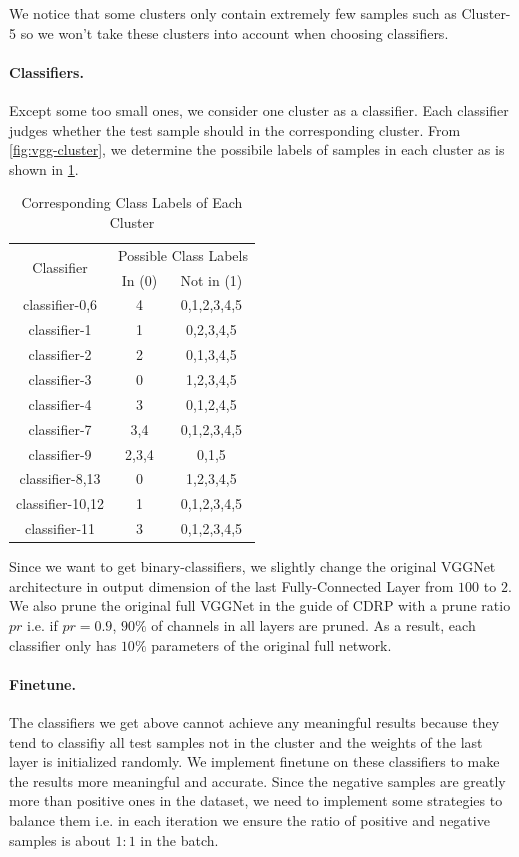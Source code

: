 \documentclass[sigplan,10pt,review]{acmart}\settopmatter{printfolios=true,printccs=false,printacmref=false}
\begin{document}
We notice that some clusters only contain extremely few samples such as Cluster-5 so we won't take these clusters into account when choosing classifiers.

\paragraph{Classifiers.} Except some too small ones, we consider one cluster as a classifier. Each classifier judges whether the test sample should in the corresponding cluster. 
From \cref{fig:vgg-cluster}, we determine the possibile labels of samples in each cluster as is shown in \cref{tab:cluster_label}. 

\begin{table}[h]
	\caption{Corresponding Class Labels of Each Cluster}
	\label{tab:cluster_label}
	\begin{tabular}{|c|c|c|}
	\hline
	\multirow{2}{*}{Classifier} &\multicolumn{2}{c|}{Possible Class Labels}\\
	\cline{2-3}
	& In (0) & Not in (1)\\
	\hline
	classifier-0,6 & 4 & 0,1,2,3,4,5\\
	classifier-1 & 1 & 0,2,3,4,5\\
	classifier-2 & 2 & 0,1,3,4,5\\
	classifier-3 & 0 & 1,2,3,4,5\\
	classifier-4 & 3 & 0,1,2,4,5\\
	classifier-7 & 3,4 & 0,1,2,3,4,5\\ 
	classifier-9 & 2,3,4 & 0,1,5\\ 
	classifier-8,13 & 0 & 1,2,3,4,5\\
	classifier-10,12 & 1 & 0,1,2,3,4,5\\
	classifier-11 & 3 & 0,1,2,3,4,5\\
	\hline
	\end{tabular}
\end{table}

Since we want to get binary-classifiers, we slightly change the original VGGNet architecture in output dimension of the last Fully-Connected Layer from $100$ to $2$. 
We also prune the original full VGGNet in the guide of CDRP with a prune ratio $pr$ i.e. if $pr=0.9$, $90\%$ of channels in all layers are pruned. 
As a result, each classifier only has $10\%$ parameters of the original full network.

\paragraph{Finetune.} The classifiers we get above cannot achieve any meaningful results because they tend to classifiy all test samples not in the cluster and the weights of the last layer is initialized randomly.
We implement finetune on these classifiers to make the results more meaningful and accurate. 
Since the negative samples are greatly more than positive ones in the dataset, we need to implement some strategies to balance them i.e. in each iteration we ensure the ratio of positive and negative samples is about $1:1$ in the batch.
\end{document}
